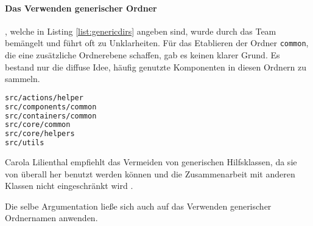\paragraph{Das Verwenden generischer Ordner}, welche in Listing \ref{list:genericdirs} angeben sind, wurde durch das Team bemängelt und führt oft zu Unklarheiten. Für das Etablieren der Ordner \lstinline|common|, die eine zusätzliche Ordnerebene schaffen, gab es keinen klarer Grund. Es bestand nur die diffuse Idee, häufig genutzte Komponenten in diesen Ordnern zu sammeln. 

\begin{lstlisting}[language={sh}, label=list:genericdirs, caption=generische Ordner die innerhalb des FreeDesign-Projektes genutzt werden]
src/actions/helper
src/components/common
src/containers/common
src/core/common
src/core/helpers
src/utils
\end{lstlisting}

Carola Lilienthal empfiehlt das Vermeiden von generischen Hilfsklassen, da sie von überall her benutzt werden können und die Zusammenarbeit mit anderen Klassen nicht eingeschränkt wird \autocite[vgl.][159]{Lilienthal2019}. 

Die selbe Argumentation ließe sich auch auf das Verwenden generischer Ordnernamen anwenden. 

